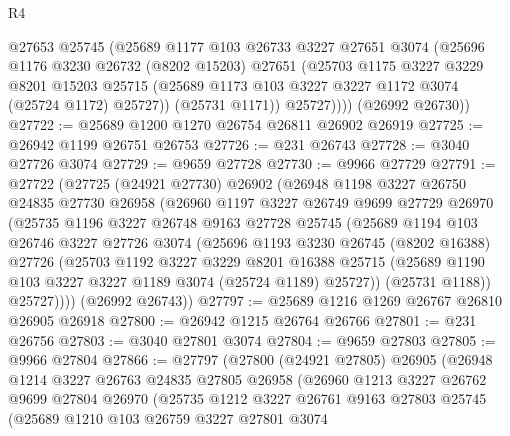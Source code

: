 \begin{lexlean}{R4}
\begin{coremodule}
            @27653
            @25745
            (@25689
              @1177
              @103
              @26733
              @3227
              @27651
              @3074
              (@25696
                @1176
                @3230
                @26732
                (@8202 @15203)
                @27651
                (@25703
                  @1175
                  @3227
                  @3229
                  @8201
                  @15203
                  @25715
                  (@25689 @1173 @103 @3227 @3227 @1172 @3074 (@25724 @1172) @25727))
                (@25731 @1171))
              @25727))))
      (@26992 @26730))
@27722 := @25689 @1200 @1270 @26754 @26811 @26902 @26919
@27725 := @26942 @1199 @26751 @26753
@27726 := @231 @26743
@27728 := @3040 @27726 @3074
@27729 := @9659 @27728
@27730 := @9966 @27729
@27791 := @27722
    (@27725
      (@24921 @27730)
      @26902
      (@26948
        @1198
        @3227
        @26750
        @24835
        @27730
        @26958
        (@26960
          @1197
          @3227
          @26749
          @9699
          @27729
          @26970
          (@25735
            @1196
            @3227
            @26748
            @9163
            @27728
            @25745
            (@25689
              @1194
              @103
              @26746
              @3227
              @27726
              @3074
              (@25696
                @1193
                @3230
                @26745
                (@8202 @16388)
                @27726
                (@25703
                  @1192
                  @3227
                  @3229
                  @8201
                  @16388
                  @25715
                  (@25689 @1190 @103 @3227 @3227 @1189 @3074 (@25724 @1189) @25727))
                (@25731 @1188))
              @25727))))
      (@26992 @26743))
@27797 := @25689 @1216 @1269 @26767 @26810 @26905 @26918
@27800 := @26942 @1215 @26764 @26766
@27801 := @231 @26756
@27803 := @3040 @27801 @3074
@27804 := @9659 @27803
@27805 := @9966 @27804
@27866 := @27797
    (@27800
      (@24921 @27805)
      @26905
      (@26948
        @1214
        @3227
        @26763
        @24835
        @27805
        @26958
        (@26960
          @1213
          @3227
          @26762
          @9699
          @27804
          @26970
          (@25735
            @1212
            @3227
            @26761
            @9163
            @27803
            @25745
            (@25689
              @1210
              @103
              @26759
              @3227
              @27801
              @3074

\end{coremodule}
\end{lexlean}
